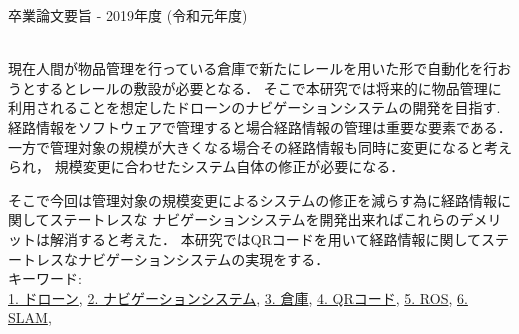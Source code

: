 卒業論文要旨 - 2019年度 (令和元年度)
\begin{center}
\begin{large}
\end{large}
\end{center}
~ \\
現在人間が物品管理を行っている倉庫で新たにレールを用いた形で自動化を行おうとするとレールの敷設が必要となる．
そこで本研究では将来的に物品管理に利用されることを想定したドローンのナビゲーションシステムの開発を目指す.
経路情報をソフトウェアで管理すると場合経路情報の管理は重要な要素である．
一方で管理対象の規模が大きくなる場合その経路情報も同時に変更になると考えられ，
規模変更に合わせたシステム自体の修正が必要になる．

そこで今回は管理対象の規模変更によるシステムの修正を減らす為に経路情報に関してステートレスな
ナビゲーションシステムを開発出来ればこれらのデメリットは解消すると考えた．
本研究ではQRコードを用いて経路情報に関してステートレスなナビゲーションシステムの実現をする．
~ \\
キーワード:\\
\underline{1. ドローン},
\underline{2. ナビゲーションシステム},
\underline{3. 倉庫},
\underline{4. QRコード},
\underline{5. ROS},
\underline{6. SLAM},
\begin{flushright}
\dept \\
\author
\end{flushright}
